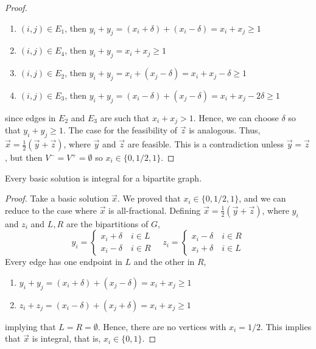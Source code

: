 \begin{proof}
	 \begin{enumerate}
	 	\item $(i,j) \in E_1$, then $y_i + y_j = (x_i + \delta) + (x_i - \delta) = x_i + x_j \geq 1$
	 	\item $(i,j) \in E_4$, then $y_i + y_j = x_i + x_j \geq 1$
	 	\item $(i,j) \in E_2$, then $y_i + y_j = x_i + (x_j - \delta) = x_i + x_j - \delta \geq 1$
	 	\item $(i,j) \in E_3$, then $y_i + y_j = (x_i - \delta)  + (x_j - \delta) = x_i + x_j - 2\delta \geq 1$
	 \end{enumerate}
	 \noindent since edges in $E_2$ and $E_3$ are such that $x_i + x_j > 1$. Hence, we can choose $\delta$ so that $y_i + y_j \geq 1$. The case for the feasibility of $\Vec{z}$ is analogous. Thus, $\Vec{x} = \frac{1}{2}(\Vec{y} + \Vec{z})$, where $\Vec{y}$ and $\Vec{z}$ are feasible. This is a contradiction unless $\Vec{y} = \Vec{z}$, but then $V^- = V^+ = \emptyset$ so $x_i \in \{0,1/2,1\}$.
\end{proof}

\begin{cor}
	Every basic solution is integral for a bipartite graph.
\end{cor}

\begin{proof}
	Take a basic solution $\Vec{x}$. We proved that $x_i \in \{0,1/2,1\}$, and we can reduce to the case where $\Vec{x}$ is all-fractional. Defining $\Vec{x} = \frac{1}{2}(\Vec{y} + \Vec{z})$, where $y_i$ and $z_i$ and $L, R$ are the bipartitions of $G$,
	\[y_{i}=\left\{\begin{array}{l}
	x_{i}+\delta \quad i \in L \\
	x_{i}-\delta \quad i \in R
	\end{array} \quad z_i =\left\{\begin{array}{l}
	x_{i}-\delta \quad i \in R \\
	x_{i}+\delta \quad i \in L
	\end{array}\right.\right.\]
	\noindent Every edge has one endpoint in $L$ and the other in $R$, 
	\begin{enumerate}
		\item $y_i + y_j = (x_i + \delta) + (x_j - \delta) = x_i + x_j \geq 1$
		\item $z_i + z_j = (x_i - \delta) + (x_j + \delta) = x_i + x_j \geq 1$
	\end{enumerate}
	\noindent implying that $L = R = \emptyset$. Hence, there are no vertices with $x_i = 1/2$. This implies that $\Vec{x}$ is integral, that is, $x_i \in \{0,1\}$.
\end{proof}

